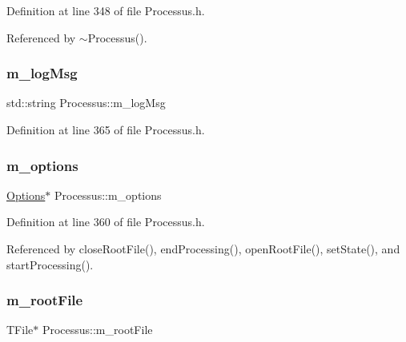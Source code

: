Definition at line 348 of file Processus.\+h.



Referenced by $\sim$\+Processus().

\mbox{\label{classProcessus_a3bc0140a3a69a83951ab7f9986bd2c84}} 
\subsubsection{\texorpdfstring{m\+\_\+log\+Msg}{m\_logMsg}}
{\footnotesize\ttfamily std\+::string Processus\+::m\+\_\+log\+Msg\hspace{0.3cm}{\ttfamily [private]}}



Definition at line 365 of file Processus.\+h.

\mbox{\label{classProcessus_a74205f3c1e00c4448f7b3257c2351797}} 
\subsubsection{\texorpdfstring{m\+\_\+options}{m\_options}}
{\footnotesize\ttfamily \hyperlink{classOptions}{Options}$\ast$ Processus\+::m\+\_\+options\hspace{0.3cm}{\ttfamily [private]}}



Definition at line 360 of file Processus.\+h.



Referenced by close\+Root\+File(), end\+Processing(), open\+Root\+File(), set\+State(), and start\+Processing().

\mbox{\label{classProcessus_a76114f8cf2111e910c323a7ae05a015d}} 
\subsubsection{\texorpdfstring{m\+\_\+root\+File}{m\_rootFile}}
{\footnotesize\ttfamily T\+File$\ast$ Processus\+::m\+\_\+root\+File\hspace{0.3cm}{\ttfamily [private]}}



